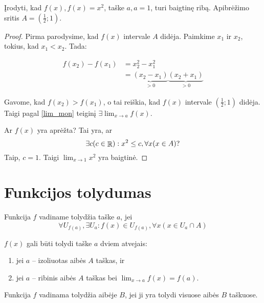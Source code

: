 \begin{exmp}
  Įrodyti, kad $f(x), f(x) = x^2$, taške $a, a = 1$, turi baigtinę ribą.
  Apibrėžimo sritis $A = \left( \frac{1}{2}; 1 \right)$.

  \begin{proof}
    Pirma parodysime, kad $f(x)$ intervale $A$ didėja. Paimkime 
    $x_{1}$ ir $x_{2}$, tokius, kad $x_{1} < x_{2}$. Tada:

    \begin{align*}
      f(x_{2}) - f(x_{1}) 
      &= x _{2} ^{2} - x _{1} ^{2} \\
      &= \underbrace{(x_{2} - x_{1})}_{> 0}
        \underbrace{(x_{2} + x_{1})}_{> 0}
    \end{align*}

    Gavome, kad $f(x_{2}) > f(x_{1})$, o tai reiškia, kad $f(x)$ intervale
    $\left( \frac{1}{2} ; 1 \right)$ didėja. Taigi pagal \ref{lim_mon}
    teiginį $\exists \lim_{x \to a} f(x)$.

    Ar $f(x)$ yra aprėžta? Tai yra, ar
    \begin{equation*}
      \exists c (c \in \mathop{\mathbb{R}}) : x^{2} \leq c, \forall x (x \in A)?
    \end{equation*}
    Taip, $c = 1$. Taigi $\lim_{x \to 1} x^{2}$ yra baigtinė.
  \end{proof}
\end{exmp}

\section{Funkcijos tolydumas}

\begin{defn}
  Funkcija $f$ vadiname tolydžia taške $a$, jei 
  \begin{equation*}
    \forall U_{f(a)}, \exists U_{a} : 
      f(x) \in U_{f(a)}, \forall x (x \in U_{a} \cap A)
  \end{equation*}
\end{defn}

$f(x)$ gali būti tolydi taške $a$ dviem atvejais:
\begin{enumerate}
  \item jei $a$ – izoliuotas aibės $A$ taškas, ir 
  \item jei $a$ – ribinis aibės $A$ taškas bei 
    $\lim_{x \to a} f(x) = f(a)$.
\end{enumerate}

\begin{defn}
  Funkcija $f$ vadinama tolydžia aibėje $B$, jei ji yra tolydi visuose
  aibės $B$ taškuose.
\end{defn}


